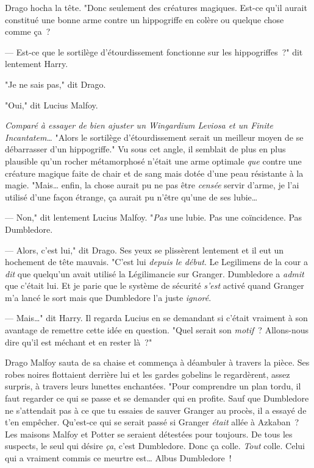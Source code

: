 Drago hocha la tête. "Donc seulement des créatures magiques. Est-ce qu'il aurait constitué une bonne arme contre un hippogriffe en colère ou quelque chose comme ça~?

--- Est-ce que le sortilège d'étourdissement fonctionne sur les hippogriffes~?" dit lentement Harry.

"Je ne sais pas," dit Drago.

"Oui," dit Lucius Malfoy.

\emph{Comparé à essayer de bien ajuster un Wingardium Leviosa et un Finite Incantatem…} "Alors le sortilège d'étourdissement serait un meilleur moyen de se débarrasser d'un hippogriffe." Vu sous cet angle, il semblait de plus en plus plausible qu'un rocher métamorphosé n'était une arme optimale \emph{que} contre une créature magique faite de chair et de sang mais dotée d'une peau résistante à la magie. "Mais… enfin, la chose aurait pu ne pas être \emph{censée} servir d'arme, je l'ai utilisé d'une façon étrange, ça aurait pu n'être qu'une de ses lubie…

--- Non," dit lentement Lucius Malfoy. "\emph{Pas} une lubie. Pas une coïncidence. Pas Dumbledore.

--- Alors, c'est lui," dit Drago. Ses yeux se plissèrent lentement et il eut un hochement de tête mauvais. "C'est lui \emph{depuis le début}. Le Legilimens de la cour a \emph{dit} que quelqu'un avait utilisé la Légilimancie sur Granger. Dumbledore a \emph{admit} que c'était lui. Et je parie que le système de sécurité \emph{s'est} activé quand Granger m'a lancé le sort mais que Dumbledore l'a juste \emph{ignoré}.

--- Mais…" dit Harry. Il regarda Lucius en se demandant si c'était vraiment à son avantage de remettre cette idée en question. "Quel serait son \emph{motif}~? Allons-nous dire qu'il est méchant et en rester là~?"

Drago Malfoy sauta de sa chaise et commença à déambuler à travers la pièce. Ses robes noires flottaient derrière lui et les gardes gobelins le regardèrent, assez surpris, à travers leurs lunettes enchantées. "Pour comprendre un plan tordu, il faut regarder ce qui se passe et se demander qui en profite. Sauf que Dumbledore ne s'attendait pas à ce que tu essaies de sauver Granger au procès, il a essayé de t'en empêcher. Qu'est-ce qui se serait passé si Granger \emph{était} allée à Azkaban~? Les maisons Malfoy et Potter se seraient détestées pour toujours. De tous les suspects, le seul qui désire \emph{ça}, c'est Dumbledore. Donc ça colle. \emph{Tout} colle. Celui qui a vraiment commis ce meurtre est… Albus Dumbledore~!

